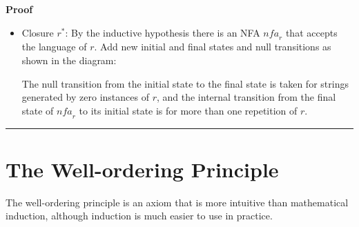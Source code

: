 \documentclass[12pt,a4paper]{article}
\newcommand*{\qed}{\hfill\rule[-2pt]{4pt}{10pt}}
\newenvironment{proof}{\textbf{Proof}}{\qed}
\begin{document}
\begin{proof}
\begin{itemize}
\item Closure $r^*$: By the inductive hypothesis there is an NFA $\mathit{nfa}_r$ that accepts the language of $r$. Add new initial and final states and null transitions as shown in the diagram:
\begin{center}
\end{center}
The null transition from the initial state to the final state is taken for strings generated by zero instances of $r$, and the internal transition from the final state of $\mathit{nfa}_r$ to its initial state is for more than one repetition of $r$.
\end{itemize}
\vspace*{-4ex}
\end{proof}

\section{The Well-ordering Principle}\label{s.well}

The well-ordering principle is an axiom that is more intuitive than mathematical induction, although induction is much easier to use in practice.
\end{document}
